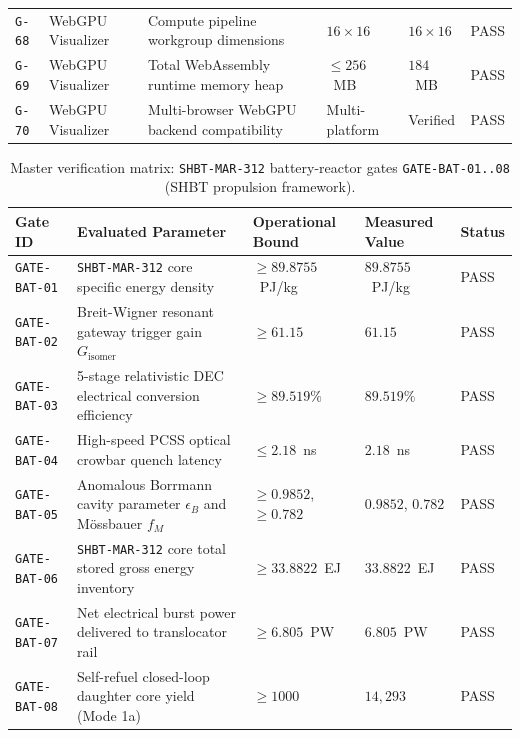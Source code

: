 \documentclass[11pt,onecolumn]{article}
\begin{document}
\begin{table}[!htbp]
\begin{tabularx}{\textwidth}{@{}l p{2.8cm} p{4.6cm} p{2.8cm} p{2.8cm} l@{}}
\texttt{G-68} & WebGPU Visualizer & Compute pipeline workgroup dimensions & $16\times 16$ & $16\times 16$ & PASS \\
\texttt{G-69} & WebGPU Visualizer & Total WebAssembly runtime memory heap & $\le 256$~MB & $184$~MB & PASS \\
\texttt{G-70} & WebGPU Visualizer & Multi-browser WebGPU backend compatibility & Multi-platform & Verified & PASS \\
\bottomrule
\end{tabularx}
\end{table}

\begin{table}[!htbp]
\centering\small
\caption{Master verification matrix: \texttt{SHBT-MAR-312} battery-reactor gates \texttt{GATE-BAT-01..08} (SHBT propulsion framework).}
\label{tab:matrix_bat}
\begin{tabularx}{\textwidth}{@{}l p{4.6cm} p{3.2cm} p{3.2cm} l@{}}
\toprule
Gate ID & Evaluated Parameter & Operational Bound & Measured Value & Status \\
\midrule
\texttt{GATE-BAT-01} & \texttt{SHBT-MAR-312} core specific energy density & $\ge 89.8755$~PJ/kg & $89.8755$~PJ/kg & PASS \\
\texttt{GATE-BAT-02} & Breit-Wigner resonant gateway trigger gain $G_{\text{isomer}}$ & $\ge 61.15$ & $61.15$ & PASS \\
\texttt{GATE-BAT-03} & 5-stage relativistic DEC electrical conversion efficiency & $\ge 89.519\%$ & $89.519\%$ & PASS \\
\texttt{GATE-BAT-04} & High-speed PCSS optical crowbar quench latency & $\le 2.18$~ns & $2.18$~ns & PASS \\
\texttt{GATE-BAT-05} & Anomalous Borrmann cavity parameter $\epsilon_B$ and Mössbauer $f_M$ & $\ge 0.9852$, $\ge 0.782$ & $0.9852$, $0.782$ & PASS \\
\texttt{GATE-BAT-06} & \texttt{SHBT-MAR-312} core total stored gross energy inventory & $\ge 33.8822$~EJ & $33.8822$~EJ & PASS \\
\texttt{GATE-BAT-07} & Net electrical burst power delivered to translocator rail & $\ge 6.805$~PW & $6.805$~PW & PASS \\
\texttt{GATE-BAT-08} & Self-refuel closed-loop daughter core yield (Mode 1a) & $\ge 1000$ & $14{,}293$ & PASS \\
\bottomrule
\end{tabularx}
\end{table}
\end{document}
